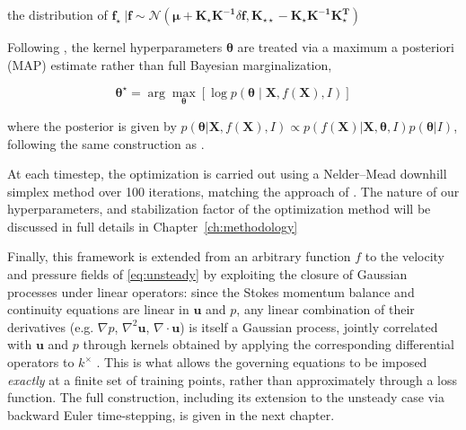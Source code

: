 \documentclass[11pt, a4paper]{report}
\begin{document}
\vspace{0.5cm}

\noindent the distribution of \(\boldsymbol{f_{\star}}\ | \boldsymbol{f} 
    \sim
    \mathcal{N}\left(
        \boldsymbol{\mu} + \boldsymbol{K_{\star}}\boldsymbol{K^{-1}}\delta \boldsymbol{f} ,  \boldsymbol{K_{\star \star}} - \boldsymbol{K_{\star}}\boldsymbol{K^{-1}}\boldsymbol{K^{T}_{\star}}
    \right)\) 

\noindent Following \textcite{Molina2023}, the kernel hyperparameters $\boldsymbol{\theta}$ are treated 
via a maximum a posteriori (MAP) estimate rather than full Bayesian marginalization,

\vspace{0.5cm}

\begin{equation}
    \boldsymbol{\theta}^\star = \arg\max_{\boldsymbol{\theta}} \left[\log p(\boldsymbol{\theta} \mid \boldsymbol{X}, f(\boldsymbol{X}), I)\right]
\end{equation}

\vspace{0.5cm}

\noindent where the posterior is given by \(p(\boldsymbol{\theta}|\boldsymbol{X},f(\boldsymbol{X}),I) \propto p(f(\boldsymbol{X})|\boldsymbol{X},\boldsymbol{\theta},I)p(\boldsymbol{\theta}|I)\), 
following the same construction as \textcite{Molina2023}. 

\vspace{0.3cm}

At each timestep, the optimization is carried out using a Nelder--Mead downhill simplex 
method over 100 iterations, matching the approach of \textcite{Molina2023}. The nature of our hyperparameters, 
and stabilization factor of the optimization method will be discussed in full details in Chapter~\ref{ch:methodology}

\vspace{0.3cm}

Finally, this framework is extended from an arbitrary function \(f\) to the velocity
and pressure fields of \eqref{eq:unsteady} by exploiting the closure of Gaussian
processes under linear operators: since the Stokes momentum balance and continuity
equations are linear in \(\boldsymbol{u}\) and \(p\), any linear combination of their
derivatives (e.g. \(\nabla p\), \(\nabla^2\boldsymbol{u}\), \(\nabla\cdot\boldsymbol{u}\)) is
itself a Gaussian process, jointly correlated with \(\boldsymbol{u}\) and \(p\) through
kernels obtained by applying the corresponding differential operators to
\(k^\times\) \parencite{Molina2023}. This is what allows the governing equations to be
imposed \emph{exactly} at a finite set of training points, rather than approximately
through a loss function. The full construction, including its extension to the
unsteady case via backward Euler time-stepping, is given in the next chapter.
\end{document}
